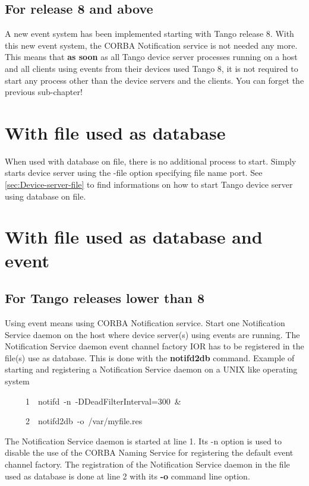 \subsection{For release 8 and above}

A new event system has been implemented starting with Tango release
8. With this new event system, the CORBA Notification service is not
needed any more. This means that \textbf{as soon} as all Tango device
server processes running on a host and all clients using events from
their devices used Tango 8, it is not required to start any process
other than the device servers and the clients. You can forget the
previous sub-chapter!

\section{With file used as database}

When used with database on file, there is no additional
process to start. Simply starts device server using the -file option
specifying file name port. See \ref{sec:Device-server-file} to find
informations on how to start Tango device server using database on
file.

\section{With file used as database and event}

\subsection{For Tango releases lower than 8}

Using event means using CORBA Notification service. Start one Notification
Service daemon on the host where device
server(s) using events are running. The Notification Service daemon
event channel factory IOR has to be registered in the file(s) use
as database. This is done with the \textbf{notifd2db}
command. Example of starting and registering a Notification Service
daemon on a UNIX like operating system


\begin{lyxcode}
~~~~~1~~notifd~-n~-DDeadFilterInterval=300~\&

~~~~~2~~notifd2db~-o~/var/myfile.res
\end{lyxcode}


The Notification Service daemon is started at line 1. Its \textquotedbl{}-n\textquotedbl{}
option is used to disable the use of the CORBA Naming Service for
registering the default event channel factory. The registration of
the Notification Service daemon in the file used as database is done
at line 2 with its \textbf{-o} command line option.

